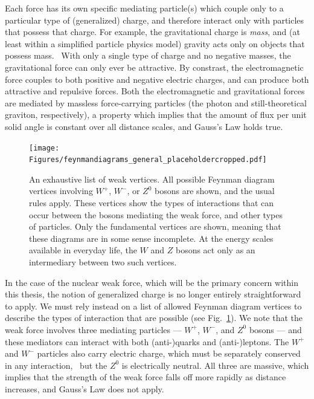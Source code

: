 %
Each force has its own specific mediating particle(s) which couple only to a particular type of (generalized) charge, and therefore interact only with particles that possess that charge.  For example, the gravitational charge is \emph{mass}, and (at least within a simplified particle physics model) gravity acts only on objects that possess mass.~  With only a single type of charge and no negative masses, the gravitational force can only ever be attractive.
%
By constrast, the electromagnetic force couples to both positive and negative electric charges, and can produce both attractive and repulsive forces.  Both the electromagnetic and gravitational forces are mediated by massless force-carrying particles (the photon and still-theoretical graviton, respectively), a property which implies that the amount of flux per unit solid angle is constant over all distance scales, and Gauss's Law holds true.

\begin{figure}[h!t!b!]
	\centering
	\texttt{[image: Figures/feynmandiagrams\_general\_placeholdercropped.pdf]}
	\caption[An exhaustive list of weak vertices]{An exhaustive list of weak vertices.  All possible Feynman diagram vertices involving $W^+$, $W^-$, or $Z^0$ bosons are shown, and the usual rules apply.  These vertices show the types of interactions that can occur between the bosons mediating the weak force, and other types of particles.  Only the fundamental vertices are shown, meaning that these diagrams are in some sense incomplete.  At the energy scales available in everyday life, the $W$ and $Z$ bosons act only as an intermediary between two such vertices.}	
	\label{fig:feynmandiagrams_general}
\end{figure}

In the case of the nuclear weak force, which will be the primary concern within this thesis, 
the notion of generalized charge is no longer entirely straightforward to apply.
We must rely instead on a list of allowed Feynman diagram vertices to describe the types of interaction that are possible (see Fig.~\ref{fig:feynmandiagrams_general}).  We note that the weak force involves three mediating particles --- $W^+$, $W^-$, and $Z^0$ bosons --- and these mediators can interact with both (anti-)quarks and (anti-)leptons.  The $W^+$ and $W^-$ particles also carry electric charge, which must be separately conserved in any interaction,~ but the $Z^0$ is electrically neutral.  All three are massive, which implies that the strength of the weak force falls off more rapidly as distance increases, and Gauss's Law does not apply. 


